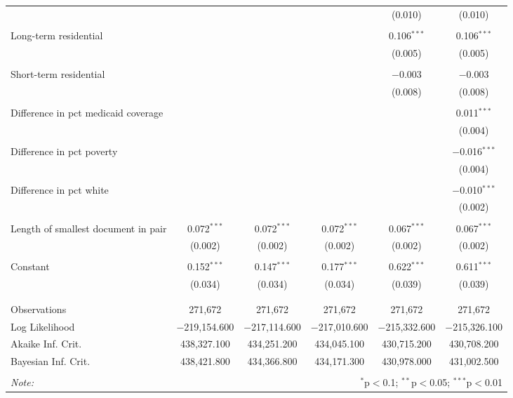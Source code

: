 \documentclass[
  12pt,
]{article}
\begin{document}
\begin{table}[!htbp]
\begin{tabular}{@{\extracolsep{0pt}}lccccc}
  &  &  &  & (0.010) & (0.010) \\ 
  & & & & & \\ 
 Long-term residential &  &  &  & 0.106$^{***}$ & 0.106$^{***}$ \\ 
  &  &  &  & (0.005) & (0.005) \\ 
  & & & & & \\ 
 Short-term residential &  &  &  & $-$0.003 & $-$0.003 \\ 
  &  &  &  & (0.008) & (0.008) \\ 
  & & & & & \\ 
 Difference in pct medicaid coverage &  &  &  &  & 0.011$^{***}$ \\ 
  &  &  &  &  & (0.004) \\ 
  & & & & & \\ 
 Difference in pct poverty &  &  &  &  & $-$0.016$^{***}$ \\ 
  &  &  &  &  & (0.004) \\ 
  & & & & & \\ 
 Difference in pct white &  &  &  &  & $-$0.010$^{***}$ \\ 
  &  &  &  &  & (0.002) \\ 
  & & & & & \\ 
 Length of smallest document in pair & 0.072$^{***}$ & 0.072$^{***}$ & 0.072$^{***}$ & 0.067$^{***}$ & 0.067$^{***}$ \\ 
  & (0.002) & (0.002) & (0.002) & (0.002) & (0.002) \\ 
  & & & & & \\ 
 Constant & 0.152$^{***}$ & 0.147$^{***}$ & 0.177$^{***}$ & 0.622$^{***}$ & 0.611$^{***}$ \\ 
  & (0.034) & (0.034) & (0.034) & (0.039) & (0.039) \\ 
  & & & & & \\ 
\hline \\[-1.8ex] 
Observations & 271,672 & 271,672 & 271,672 & 271,672 & 271,672 \\ 
Log Likelihood & $-$219,154.600 & $-$217,114.600 & $-$217,010.600 & $-$215,332.600 & $-$215,326.100 \\ 
Akaike Inf. Crit. & 438,327.100 & 434,251.200 & 434,045.100 & 430,715.200 & 430,708.200 \\ 
Bayesian Inf. Crit. & 438,421.800 & 434,366.800 & 434,171.300 & 430,978.000 & 431,002.500 \\ 
\hline 
\hline \\[-1.8ex] 
\textit{Note:}  & \multicolumn{5}{r}{$^{*}$p$<$0.1; $^{**}$p$<$0.05; $^{***}$p$<$0.01} \\ 
\end{tabular} 
\end{table}
\end{document}
